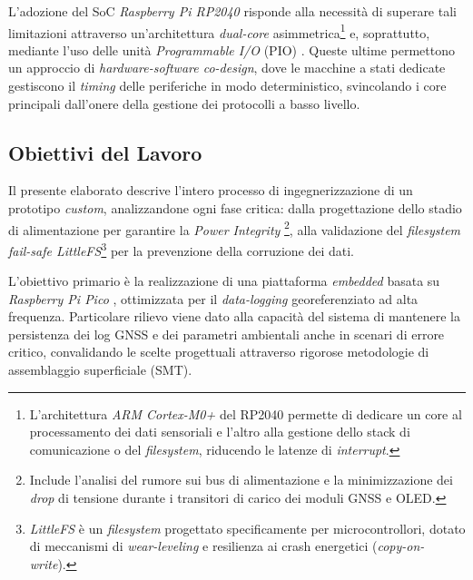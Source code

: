 L'adozione del SoC \textit{Raspberry Pi RP2040} \cite{rp2040_ds} risponde alla necessità di superare tali limitazioni attraverso un'architettura \textit{dual-core} asimmetrica\footnote{L'architettura \textit{ARM Cortex-M0+} del RP2040 permette di dedicare un core al processamento dei dati sensoriali e l'altro alla gestione dello stack di comunicazione o del \textit{filesystem}, riducendo le latenze di \textit{interrupt}.} e, soprattutto, mediante l'uso delle unità \textit{Programmable I/O} (PIO) \cite{rp2040_paper}. Queste ultime permettono un approccio di \textit{hardware-software co-design}, dove le macchine a stati dedicate gestiscono il \textit{timing} delle periferiche in modo deterministico, svincolando i core principali dall'onere della gestione dei protocolli a basso livello.

\subsection{Obiettivi del Lavoro}
Il presente elaborato descrive l'intero processo di ingegnerizzazione di un prototipo \textit{custom}, analizzandone ogni fase critica: dalla progettazione dello stadio di alimentazione per garantire la \textit{Power Integrity} \cite{tps563201_ds}\footnote{Include l'analisi del rumore sui bus di alimentazione e la minimizzazione dei \textit{drop} di tensione durante i transitori di carico dei moduli GNSS e OLED.}, alla validazione del \textit{filesystem fail-safe LittleFS}\footnote{\textit{LittleFS} è un \textit{filesystem} progettato specificamente per microcontrollori, dotato di meccanismi di \textit{wear-leveling} e resilienza ai crash energetici (\textit{copy-on-write}).} per la prevenzione della corruzione dei dati. 

L'obiettivo primario è la realizzazione di una piattaforma \textit{embedded} basata su \textit{Raspberry Pi Pico} \cite{pico_ds}, ottimizzata per il \textit{data-logging} georeferenziato ad alta frequenza. Particolare rilievo viene dato alla capacità del sistema di mantenere la persistenza dei log GNSS e dei parametri ambientali anche in scenari di errore critico, convalidando le scelte progettuali attraverso rigorose metodologie di assemblaggio superficiale (SMT).
